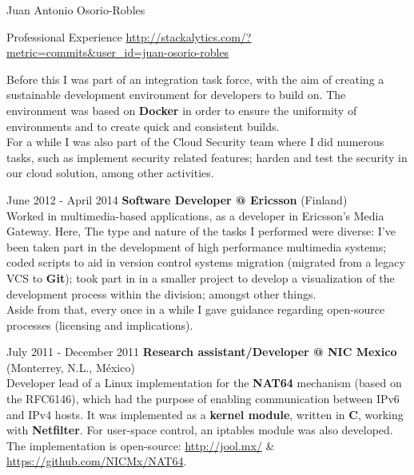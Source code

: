 \documentclass[english,11pt,letterpaper]{article}
\begin{document}
\begin{cv}{Juan Antonio Osorio-Robles}
\begin{cvlist}{Professional Experience}
            \href{http://stackalytics.com/?metric=commits&user_id=juan-osorio-robles}
            {\url{http://stackalytics.com/?metric=commits&user_id=juan-osorio-robles}}

            Before this I was part of an integration task force, with the
            aim of creating a sustainable development environment for
            developers to build on. The environment was based on
            \textbf{Docker} in order to ensure the uniformity of
            environments and to create quick and consistent builds.\\

            For a while I was also part of the Cloud Security team where
            I did numerous tasks, such as implement security related
            features; harden and test the security in our cloud solution,
            among other activities.

		\item [June 2012 - April 2014]
            \textbf{Software Developer @ Ericsson} (Finland)\\
            Worked in multimedia-based applications, as a developer in
            Ericsson's Media Gateway. Here, The type and nature of the
            tasks I performed were diverse: I've been taken part in the
            development of high performance multimedia systems; coded
            scripts to aid in version control systems migration (migrated
            from a legacy VCS to \textbf{Git}); took part in in a smaller
            project to develop a visualization of the development process
            within the division; amongst other things.\\

            Aside from that, every once in a while I gave guidance
            regarding open-source processes (licensing and implications).

		\item [July 2011 - December 2011]
            \textbf{Research assistant/Developer @ NIC Mexico} (Monterrey,
            N.L., M\'{e}xico)\\
            Developer lead of a Linux implementation for the \textbf{NAT64}
            mechanism (based on the RFC6146), which had the purpose of
            enabling communication between IPv6 and IPv4 hosts. It was
            implemented as a \textbf{kernel module}, written in \textbf{C},
            working with \textbf{Netfilter}. For user-space control, an
            iptables module was also developed. The implementation is
            open-source:
            \href{http://jool.mx/}{http://jool.mx/} \&\\
            \href{https://github.com/NICMx/NAT64}{https://github.com/NICMx/NAT64}.


\end{cvlist}
\end{cv}
\end{document}

